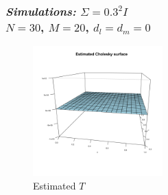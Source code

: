 \documentclass[12pt]{beamer}
\begin{document}
\begin{frame}
\frametitle{\emph{Simulations: }$\Sigma = 0.3^2 I$\\
$N = 30$, $M=20$, $d_l = d_m= 0$}


    \begin{center}
    \begin{figure}
    \graphicspath{{img/}}
 \includegraphics[width=5cm]{identity-cov-estimated-cholesky}
 \caption{Estimated $T$ }
 \end{figure}
     \end{center}
  

\end{frame}
\end{document}
